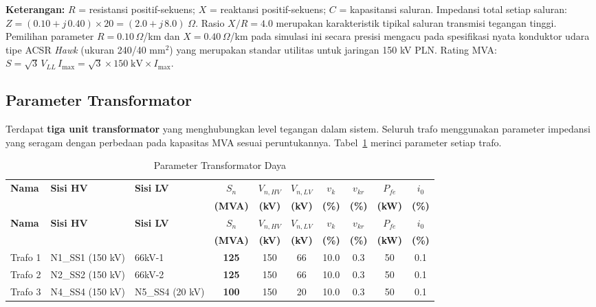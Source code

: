 \noindent\textbf{Keterangan:} $R$ = resistansi positif-sekuens; $X$ = reaktansi positif-sekuens; $C$ = kapasitansi saluran.
Impedansi total setiap saluran: $Z = (0{.}10 + j\,0{.}40) \times 20 = (2{.}0 + j\,8{.}0)\;\Omega$.
Rasio $X/R = 4{.}0$ merupakan karakteristik tipikal saluran transmisi tegangan tinggi. Pemilihan parameter $R=0{.}10\,\Omega$/km dan $X=0{.}40\,\Omega$/km pada simulasi ini secara presisi mengacu pada spesifikasi nyata konduktor udara tipe ACSR \textit{Hawk} (ukuran 240/40 mm$^2$) yang merupakan standar utilitas untuk jaringan 150 kV PLN.
Rating MVA: $S = \sqrt{3}\,V_{LL}\,I_{\max} = \sqrt{3} \times 150\;\text{kV} \times I_{\max}$.

\subsection{Parameter Transformator}
\label{subsec:Parameter_Trafo}

Terdapat \textbf{tiga unit transformator} yang menghubungkan level tegangan dalam sistem.
Seluruh trafo menggunakan parameter impedansi yang seragam dengan perbedaan pada kapasitas MVA sesuai peruntukannya.
Tabel~\ref{tab:trafo} merinci parameter setiap trafo.

\begin{longtable}{|l|p{2.7cm}|p{2.6cm}|c|c|c|c|c|c|c|}
    \caption{Parameter Transformator Daya}
    \label{tab:trafo}
    \vspace{-0.75em}\\
    \hline
    \textbf{Nama} & \textbf{Sisi HV} & \textbf{Sisi LV} &
    $S_n$ & $V_{n,HV}$ & $V_{n,LV}$ & $v_k$ & $v_{kr}$ & $P_{fe}$ & $i_0$ \\
     & & & \textbf{(MVA)} & \textbf{(kV)} & \textbf{(kV)} &
    \textbf{(\%)} & \textbf{(\%)} & \textbf{(kW)} & \textbf{(\%)} \\ \hline
    \endfirsthead
    \hline
    \textbf{Nama} & \textbf{Sisi HV} & \textbf{Sisi LV} &
    $S_n$ & $V_{n,HV}$ & $V_{n,LV}$ & $v_k$ & $v_{kr}$ & $P_{fe}$ & $i_0$ \\
     & & & \textbf{(MVA)} & \textbf{(kV)} & \textbf{(kV)} &
    \textbf{(\%)} & \textbf{(\%)} & \textbf{(kW)} & \textbf{(\%)} \\ \hline
    \endhead
    Trafo 1 & N1\_SS1 (150 kV) & 66kV-1          & \textbf{125} & 150 & 66 & 10.0 & 0.3 & 50 & 0.1 \\ \hline
    Trafo 2 & N2\_SS2 (150 kV) & 66kV-2          & \textbf{125} & 150 & 66 & 10.0 & 0.3 & 50 & 0.1 \\ \hline
    Trafo 3 & N4\_SS4 (150 kV) & N5\_SS4 (20 kV) & \textbf{100} & 150 & 20 & 10.0 & 0.3 & 50 & 0.1 \\ \hline
\end{longtable}

